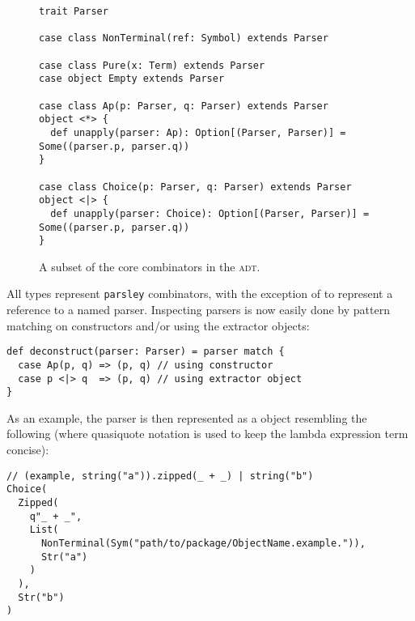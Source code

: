 \documentclass[../../main.tex]{subfiles}
\begin{document}
\begin{figure}[htbp]
\begin{verbatim}
trait Parser

case class NonTerminal(ref: Symbol) extends Parser

case class Pure(x: Term) extends Parser
case object Empty extends Parser

case class Ap(p: Parser, q: Parser) extends Parser
object <*> {
  def unapply(parser: Ap): Option[(Parser, Parser)] = Some((parser.p, parser.q))
}

case class Choice(p: Parser, q: Parser) extends Parser
object <|> {
  def unapply(parser: Choice): Option[(Parser, Parser)] = Some((parser.p, parser.q))
}
\end{verbatim}
\caption{A subset of the core combinators in the  \textsc{adt}.}
\label{fig:parser-adt}
\end{figure}

All  types represent \texttt{parsley} combinators, with the exception of  to represent a reference to a named parser.
Inspecting parsers is now easily done by pattern matching on constructors and/or using the extractor objects:
\begin{verbatim}
def deconstruct(parser: Parser) = parser match {
  case Ap(p, q) => (p, q) // using constructor
  case p <|> q  => (p, q) // using extractor object
}
\end{verbatim}
%
As an example, the  parser is then represented as a  object resembling the following (where quasiquote notation is used to keep the lambda expression term  concise):
\begin{verbatim}
// (example, string("a")).zipped(_ + _) | string("b")
Choice(
  Zipped(
    q"_ + _",
    List(
      NonTerminal(Sym("path/to/package/ObjectName.example.")),
      Str("a")
    )
  ),
  Str("b")
)
\end{verbatim}

\end{document}
